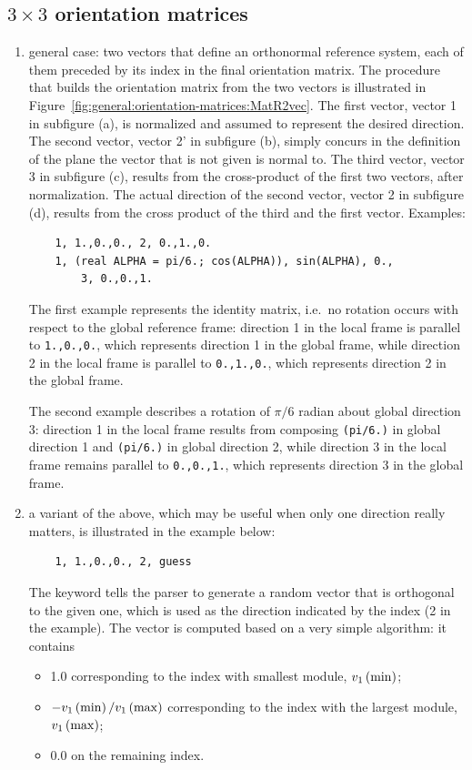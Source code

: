 \subsection{$3 \times 3$ orientation matrices}
\begin{enumerate}
\item general case: two vectors that define an orthonormal reference
system, each of them preceded by its index in the final orientation matrix.
The procedure that builds the orientation matrix from the two vectors
is illustrated in Figure~\ref{fig:general:orientation-matrices:MatR2vec}.
The first vector, vector 1 in subfigure (a), is normalized and assumed
to represent the desired direction.
The second vector, vector 2' in subfigure (b), simply concurs
in the definition of the plane the vector that is not given is normal to.
The third vector, vector 3 in subfigure (c), results from the cross-product
of the first two vectors, after normalization.
The actual direction of the second vector, vector 2 in subfigure (d),
results from the cross product of the third and the first vector.
Examples:
\begin{verbatim}
    1, 1.,0.,0., 2, 0.,1.,0.
    1, (real ALPHA = pi/6.; cos(ALPHA)), sin(ALPHA), 0.,
        3, 0.,0.,1.
\end{verbatim}
The first example represents the identity matrix, i.e.\ no rotation 
occurs with respect to the global reference frame: direction 1
in the local frame is parallel to \texttt{1.,0.,0.}, which represents
direction 1 in the global frame, while direction 2 in the local frame
is parallel to \texttt{0.,1.,0.}, which represents direction 2
in the global frame.

The second example describes a rotation of $ \pi/6 $ radian about
global direction 3: direction 1 in the local frame results from 
composing \texttt{(pi/6.)} in global direction 1
and \texttt{(pi/6.)}
in global direction 2, while direction 3 in the local frame remains
parallel to \texttt{0.,0.,1.}, which represents direction 3 in the global
frame.

\item a variant of the above, which may be useful when only one
direction really matters, is illustrated in the example below:
\begin{verbatim}
    1, 1.,0.,0., 2, guess
\end{verbatim}
The keyword  tells the parser to generate a random vector
that is orthogonal to the given one, which is used as the direction
indicated by the index (2 in the example).
The vector is computed based on a very simple algorithm: it contains
\begin{itemize}
        \item 1.0 corresponding to the index with smallest module,
        $v_1\left( \mathrm{min} \right)$;
	\item $-v_1\left( \mathrm{min} \right)/v_1\left( \mathrm{max} \right)$
	corresponding to the index with the largest module,
	$v_1\left( \mathrm{max} \right)$;
	\item 0.0 on the remaining index.
\end{itemize}


\end{enumerate}
